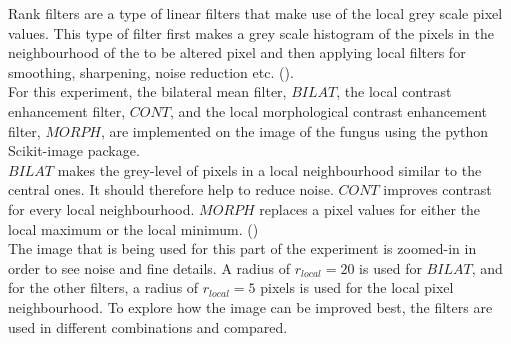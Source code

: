 Rank filters are a type of linear filters that make use of the local grey scale pixel values. This type of filter first makes a grey scale histogram of the pixels in the neighbourhood of the to be altered pixel and then applying local filters for smoothing, sharpening, noise reduction etc. (\cite{rank}).\\
For this experiment, the bilateral mean filter, $BILAT$, the local contrast enhancement filter, $CONT$, and the local morphological contrast enhancement filter, $MORPH$, are implemented on the image of the fungus using the python Scikit-image package.\\
$BILAT$ makes the grey-level of pixels in a local neighbourhood similar to the central ones. It should therefore help to reduce noise. $CONT$ improves contrast for every local neighbourhood. $MORPH$ replaces a pixel values for either the local maximum or the local minimum. (\cite{rank})\\
The image that is being used for this part of the experiment is zoomed-in in order to see noise and fine details. A radius of $r_{local} = 20$ is used for $BILAT$, and for the other filters, a radius of $r_{local} = 5$ pixels is used for the local pixel neighbourhood. To explore how the image can be improved best, the filters are used in different combinations and compared.
\clearpage


